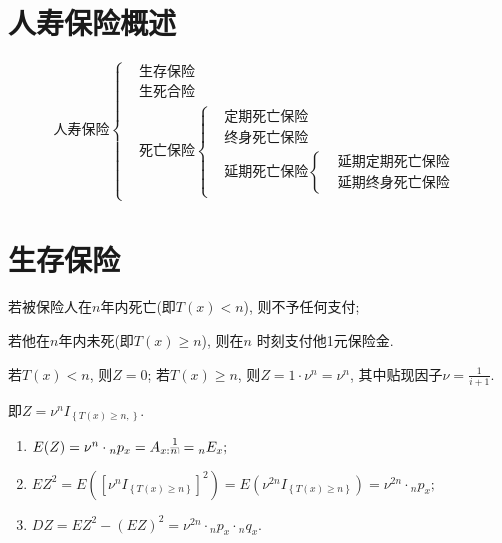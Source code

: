 \documentclass[lang=cn,10pt]{elegantbook}
\makeatletter
\DeclareRobustCommand{\annu}[1]{_{%
    \def\arraystretch{0}%
    \setlength\arraycolsep{1pt}%
    \setlength\arrayrulewidth{.2pt}%
    \begin{array}[b]{@{}c|}\hline
        \\[\arraycolsep]%
        \scriptstyle #1%
    \end{array}%
}}
\makeatother
\begin{document}
\section{人寿保险概述}
\begin{equation*}
    \text{人寿保险}
    \begin{cases}
         & \text{生存保险} \\
         & \text{生死合险} \\
         & \text{死亡保险}
		\begin{cases}
         & \text{定期死亡保险}  \\
         & \text{终身死亡保险}                   \\
         & \text{延期死亡保险}
		 \begin{cases}
         & \text{延期定期死亡保险} \\
         & \text{延期终身死亡保险}
    	 \end{cases}
    	\end{cases}
    \end{cases}
\end{equation*}

\section{生存保险}
\begin{definition}[支付现值]
	若被保险人在$n$年内死亡(即$T(x)<n$), 则不予任何支付;

若他在$n$年内未死(即$T(x)\geqslant n$), 则在$n$ 时刻支付他1元保险金.

若$T(x)<n$, 则$Z=0$; 若$T(x)\geqslant n$, 则$Z=1\cdot \nu^n=\nu^n$, 其中贴现因子$\nu=\frac{1}{i+1}.$

即$Z=\nu^nI_{\left\{ T\left( x \right) \geqslant n, \right\}}$.
\end{definition}

\begin{proposition}[精算现值与方差]
	\begin{enumerate}
		\item $E(Z)=\nu^n\cdot{}_np_x=A_{x:}\overset{1}{{}\annu{n}}={}_nE_x;$
		\item $E Z^2 =E\left( \left[ \nu^nI_{\left\{ T\left( x \right) \geqslant n \right\}} \right] ^2 \right) =E\left( \nu^{2n}I_{\left\{ T\left( x \right) \geqslant n \right\}} \right) =\nu^{2n}\cdot{}_np_x;$
		\item $DZ=EZ^2-\left( EZ \right) ^2=\nu^{2n}\cdot{}_np_x\cdot{}_nq_x.$
	\end{enumerate}
\end{proposition}
\end{document}
